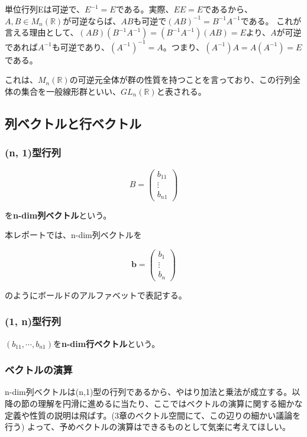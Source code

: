 \documentclass[dvipdfmx,autodetect-engine]{jsarticle}
\begin{document}

単位行列Eは可逆で、$E^{-1} = E$である。実際、$EE = E$であるから、$A, B \in M_n(\mathbb{R})$が可逆ならば、$AB$も可逆で$(AB)^{-1} = B^{-1}A^{-1}$である。
これが言える理由として、$(AB)(B^{-1}A^{-1}) = (B^{-1}A^{-1})(AB) = E$より、$A$が可逆であれば$A^{-1}$も可逆であり、$(A^{-1})^{-1} = A$。つまり、$(A^{-1})A = A(A^{-1}) = E$である。

これは、$M_n(\mathbb{R})$の可逆元全体が群の性質を持つことを言っており、この行列全体の集合を一般線形群といい、$GL_n(\mathbb{R})$と表される。

\subsection{列ベクトルと行ベクトル}

\subsubsection{(n, 1)型行列}

$$
B = \begin{pmatrix}
b_{11} \\
\vdots \\
b_{n1}
\end{pmatrix}
$$

を{\bf n-dim列ベクトル}という。

本レポートでは、n-dim列ベクトルを

$$
\bm{b} = \begin{pmatrix}
b_1 \\
\vdots \\
b_n
\end{pmatrix}
$$

のようにボールドのアルファベットで表記する。

\subsubsection{(1, n)型行列}

$(b_{11}, \cdots, b_{n1})$を{\bf n-dim行ベクトル}という。

\subsubsection{ベクトルの演算}

n-dim列ベクトルは(n,1)型の行列であるから、やはり加法と乗法が成立する。以降の節の理解を円滑に進めるに当たり、ここではベクトルの演算に関する細かな定義や性質の説明は飛ばす。(3章のベクトル空間にて、この辺りの細かい議論を行う) よって、予めベクトルの演算はできるものとして気楽に考えてほしい。
\end{document}
